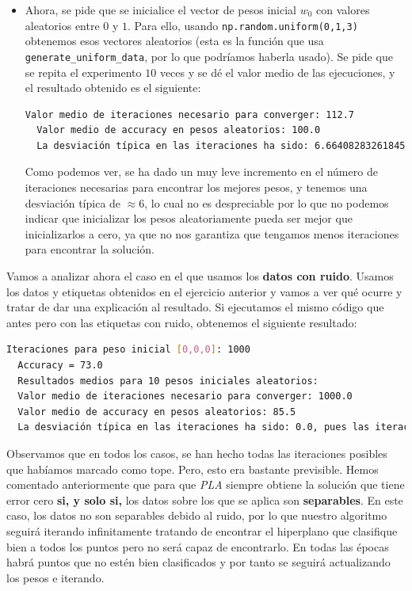 \documentclass[12pt]{article}
\begin{document}
{\begin{itemize}
\item Ahora, se pide que se inicialice el vector de pesos inicial $w_0$ con valores aleatorios entre $0$ y $1$. Para ello, usando \lstinline{np.random.uniform(0,1,3)} obtenemos esos vectores aleatorios (esta es la función que usa \lstinline{generate_uniform_data}, por lo que podríamos haberla usado). Se pide que se repita el experimento $10$ veces y se dé el valor medio de las ejecuciones, y el resultado obtenido es el siguiente:
\begin{lstlisting}[language=bash]
  Valor medio de iteraciones necesario para converger: 112.7
  Valor medio de accuracy en pesos aleatorios: 100.0
  La desviación típica en las iteraciones ha sido: 6.664082832618455, pues las iteraciones son: [110, 122, 109, 112, 111, 112, 107, 103, 127, 114]
\end{lstlisting}
Como podemos ver, se ha dado un muy leve incremento en el número de iteraciones necesarias para encontrar los mejores pesos, y tenemos una desviación típica de $\approx 6$, lo cual no es despreciable por lo que no podemos indicar que inicializar los pesos aleatoriamente pueda ser mejor que inicializarlos a cero, ya que no nos garantiza que tengamos menos iteraciones para encontrar la solución.
\end{itemize}

Vamos a analizar ahora el caso en el que usamos los \textbf{datos con ruido}. Usamos los datos y etiquetas obtenidos en el ejercicio anterior y vamos a ver qué ocurre y tratar de dar una explicación al resultado. Si ejecutamos el mismo código que antes pero con las etiquetas con ruido, obtenemos el siguiente resultado:

\begin{lstlisting}[language=bash]
  Iteraciones para peso inicial [0,0,0]: 1000
  Accuracy = 73.0
  Resultados medios para 10 pesos iniciales aleatorios:
  Valor medio de iteraciones necesario para converger: 1000.0
  Valor medio de accuracy en pesos aleatorios: 85.5
  La desviación típica en las iteraciones ha sido: 0.0, pues las iteraciones son: [1000, 1000, 1000, 1000, 1000, 1000, 1000, 1000, 1000, 1000]
\end{lstlisting}

Observamos que en todos los casos, se han hecho todas las iteraciones posibles que habíamos marcado como tope. Pero, esto era bastante previsible. Hemos comentado anteriormente que para que \emph{PLA} siempre obtiene la solución que tiene error cero \textbf{si, y solo si,} los datos sobre los que se aplica son \textbf{separables}. En este caso, los datos no son separables debido al ruido, por lo que nuestro algoritmo seguirá iterando infinitamente tratando de encontrar el hiperplano que clasifique bien a todos los puntos pero no será capaz de encontrarlo. En todas las épocas habrá puntos que no estén bien clasificados y por tanto se seguirá actualizando los pesos e iterando. 

}
\end{document}
